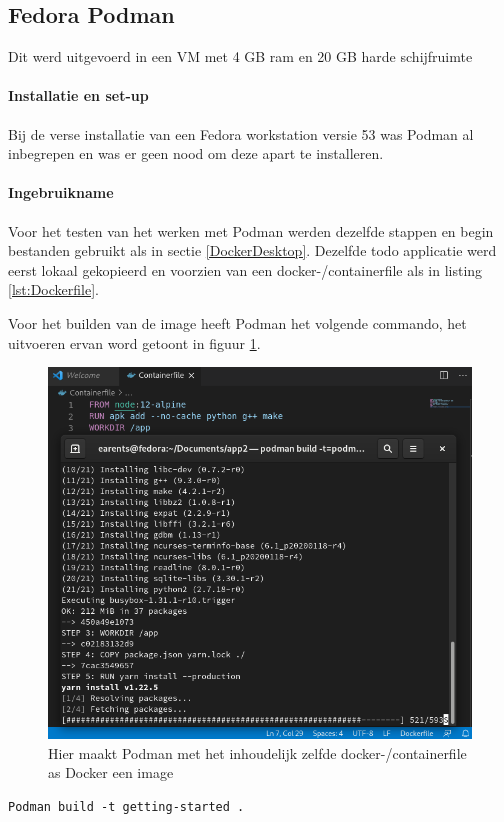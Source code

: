 \subsection{Fedora Podman}
Dit werd uitgevoerd in een VM met 4 GB ram en 20 GB harde schijfruimte
\paragraph{Installatie en set-up}
Bij de verse installatie van een Fedora workstation versie 53 was Podman al inbegrepen en was er geen nood om deze apart te installeren.

\paragraph{Ingebruikname}
Voor het testen van het werken met Podman werden dezelfde stappen en begin bestanden gebruikt als in sectie \ref{DockerDesktop}. Dezelfde todo applicatie werd eerst lokaal gekopieerd en voorzien van een docker-/containerfile als in listing \ref{lst:Dockerfile}.

Voor het builden van de image heeft Podman het volgende commando, het uitvoeren ervan  word getoont in figuur \ref{fig:podmanbuild}.
\begin{figure}[h]
    \includegraphics[width=\linewidth]{img/podmanbuild.png}
    \caption[Met podman een containerfile builden]{Hier maakt Podman met het inhoudelijk zelfde docker-/containerfile as Docker een image}
    \label{fig:podmanbuild}
    \centering
\end{figure}
\begin{verbatim}
Podman build -t getting-started .
\end{verbatim}
 
